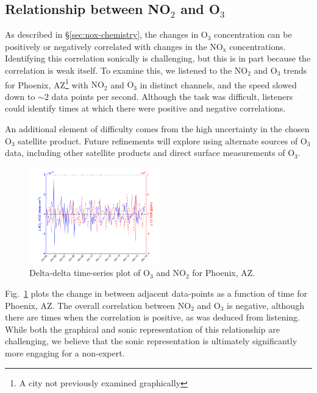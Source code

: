 \documentclass[a4paper,10pt,oneside]{article}
\newcommand{\ce}[1]{$\mathrm{#1}$}
\begin{document}
\begin{sloppy}
\subsection{Relationship between NO$_2$ and O$_3$}

	As described in \S\ref{sec:nox-chemistry}, the changes in \ce{O_3} concentration can be positively or negatively correlated with changes in the \ce{NO_x} concentrations. Identifying this correlation sonically is challenging, but this is in part because the correlation is weak itself. To examine this, we listened to the \ce{NO_2} and \ce{O_3} trends for Phoenix, AZ\footnote{A city not previously examined graphically} with \ce{NO_2} and \ce{O_3} in distinct channels, and the speed slowed down to $\sim 2$ data points per second.  Although the task was difficult, listeners  could identify times at which there were positive and negative correlations.  
	
	An additional element of difficulty comes from the high uncertainty in the chosen \ce{O_3} satellite product. Future refinements will explore using alternate sources of \ce{O_3} data, including other satellite products and direct surface measurements of \ce{O_3}.
	
	\begin{figure}
	\centering
	\includegraphics[width=0.5\textwidth]{figs/delta-delta-timeser-phoenix_AZ.png} 
	\caption{Delta-delta time-series plot of \ce{O_3} and \ce{NO_2} for Phoenix, AZ.}
	\label{fig:del-del}
	\end{figure}
	
	Fig.~\ref{fig:del-del} plots the change in  between adjacent data-points as a function of time for Phoenix, AZ. The overall correlation between \ce{NO_2} and \ce{O_3} is negative, although there are times when the correlation is positive, as was deduced from listening. While both the graphical and sonic representation of this relationship are challenging, we believe that the sonic representation is ultimately significantly more engaging for a non-expert.


\end{sloppy}
\end{document}
